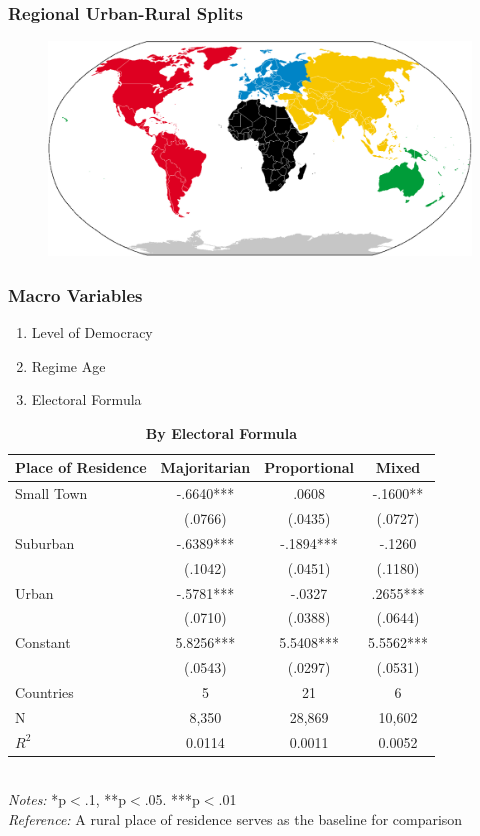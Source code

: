 \documentclass[20pt]{beamer}
\newcommand\e{\emph}
\newcommand\tb{\textbf}
\begin{document}
\begin{frame}
\frametitle{Regional Urban-Rural Splits}
\begin{figure}[H]    \centering
	{	 \includegraphics[width=\textwidth]{Regions}}
\end{figure}
\end{frame}

\begin{frame}
\frametitle{Macro Variables}
\begin{enumerate}
	\item Level of Democracy
	\item Regime Age
	\item Electoral Formula
\end{enumerate}	
\end{frame}

\begin{frame}
\tiny
\begin{table}[h!]
	\centering
	\caption{\tb{By Electoral Formula}}
	\begin{tabulary}{\linewidth}{l c c c}
		\\
		\hline
		\tb{Place of Residence}&\tb{Majoritarian}&\tb{Proportional} &\tb{Mixed} \\
		\hline
		Small Town&-.6640*** &.0608 &-.1600** \\
		&(.0766)&(.0435) &(.0727) \\
		Suburban&-.6389*** &-.1894***&-.1260  \\
		&(.1042) &(.0451) &(.1180) \\
		Urban&-.5781*** &-.0327 &.2655*** \\
		&(.0710) &(.0388) &(.0644) \\
		Constant& 5.8256*** &5.5408***&5.5562*** \\
		&(.0543) &(.0297) &(.0531) \\
		Countries&5&21&6 \\
		N&8,350&28,869 &10,602 \\
		$R^2$&0.0114&0.0011 &0.0052 \\
		\hline 
	\end{tabulary} 
	\\ 
	\e{Notes:} *p$<$.1, **p$<$.05. ***p$<$.01 \\
	\e{Reference:} A rural place of residence serves as the baseline for comparison
\end{table}
\end{frame}
\end{document}
